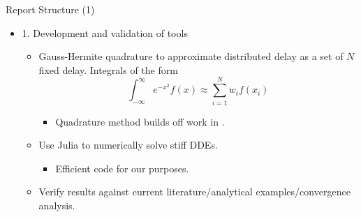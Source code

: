 \documentclass{beamer}
\begin{document}
\begin{frame}{Report Structure (1)}
    \begin{itemize}
        \item 1. Development and validation of tools
        \begin{itemize}
            \item Gauss-Hermite quadrature to approximate distributed delay as a set of $N$ fixed delay. Integrals of the form
            \begin{equation}
                \int_{-\infty}^{\infty}e^{-x^2}f(x)\approx\sum_{i=1}^Nw_if(x_i)
            \end{equation}
            \begin{itemize}
                \item Quadrature method builds off work in \cite{william}.
            \end{itemize}
            \item Use Julia to numerically solve stiff DDEs.
            \begin{itemize}
                \item Efficient code for our purposes.
            \end{itemize}
            \item Verify results against current literature/analytical examples/convergence analysis.
        \end{itemize}
    \end{itemize}

\end{frame}
\end{document}
